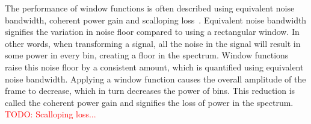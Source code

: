 \documentclass[10pt,twocolumn]{article}
\begin{document}
The performance of window functions is often described using equivalent noise bandwidth, coherent power gain and scalloping loss~\cite{windowperf}. Equivalent noise bandwidth signifies the variation in noise floor compared to using a rectangular window. In other words, when transforming a signal, all the noise in the signal will result in some power in every bin, creating a floor in the spectrum. Window functions raise this noise floor by a consistent amount, which is quantified using equivalent noise bandwidth.
%
Applying a window function causes the overall amplitude of the frame to decrease, which in turn decreases the power of bins. This reduction is called the coherent power gain and signifies the loss of power in the spectrum.
%
\textcolor{red}{TODO: Scalloping loss...}
\begin{figure}[H]
    \centering
    \incl
\end{figure}
\end{document}
